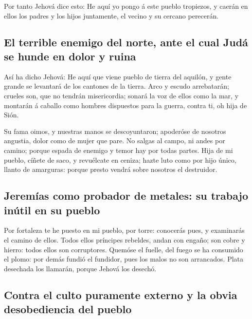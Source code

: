  Por tanto Jehová dice esto: He aquí yo pongo á este
pueblo tropiezos, y caerán en ellos los padres y los hijos juntamente,
el vecino y su cercano perecerán.

\hypertarget{el-terrible-enemigo-del-norte-ante-el-cual-juduxe1-se-hunde-en-dolor-y-ruina}{%
\subsection{El terrible enemigo del norte, ante el cual Judá se hunde en
dolor y
ruina}\label{el-terrible-enemigo-del-norte-ante-el-cual-juduxe1-se-hunde-en-dolor-y-ruina}}

 Así ha dicho Jehová: He aquí que viene pueblo de tierra
del aquilón, y gente grande se levantará de los cantones de la tierra.
 Arco y escudo arrebatarán; crueles son, que no tendrán
misericordia; sonará la voz de ellos como la mar, y montarán á caballo
como hombres dispuestos para la guerra, contra ti, oh hija de Sión.

 Su fama oimos, y nuestras manos se descoyuntaron;
apoderóse de nosotros angustia, dolor como de mujer que pare.
 No salgas al campo, ni andes por camino; porque espada
de enemigo y temor hay por todas partes.  Hija de mi
pueblo, cíñete de saco, y revuélcate en ceniza; hazte luto como por hijo
único, llanto de amarguras: porque presto vendrá sobre nosotros el
destruidor.

\hypertarget{jeremuxedas-como-probador-de-metales-su-trabajo-inuxfatil-en-su-pueblo}{%
\subsection{Jeremías como probador de metales: su trabajo inútil en su
pueblo}\label{jeremuxedas-como-probador-de-metales-su-trabajo-inuxfatil-en-su-pueblo}}

 Por fortaleza te he puesto en mi pueblo, por torre:
conocerás pues, y examinarás el camino de ellos.  Todos
ellos príncipes rebeldes, andan con engaño; son cobre y hierro: todos
ellos son corruptores.  Quemóse el fuelle, del fuego se
ha consumido el plomo: por demás fundió el fundidor, pues los malos no
son arrancados.  Plata desechada los llamarán, porque
Jehová los desechó.

\hypertarget{contra-el-culto-puramente-externo-y-la-obvia-desobediencia-del-pueblo}{%
\subsection{Contra el culto puramente externo y la obvia desobediencia
del
pueblo}\label{contra-el-culto-puramente-externo-y-la-obvia-desobediencia-del-pueblo}}

